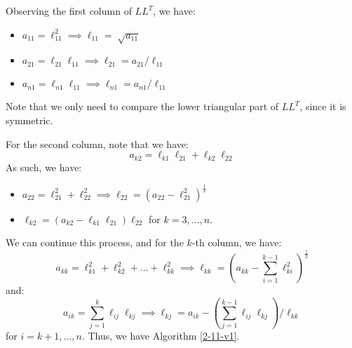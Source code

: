 \documentclass[../main/main.tex]{subfiles}
\begin{document}
    Observing the first column of $L L ^{ T }$, we have:
    \begin{itemize}
\item $a_{11} = \ell_{11}^2 \implies \ell_{11} = \sqrt[]{a_{11}}$
            \item $a_{21}= \ell_{21}\ell_{11} \implies \ell_{21} = a_{21} / \ell_{11}$
            \item $a_{n1}= \ell_{n1}\ell_{11} \implies \ell_{n1} = a_{n1} / \ell_{11}$
    \end{itemize}
    \begin{remark}
Note that we only need to compare the lower triangular part of $L L^{T}$, since it is symmetric.
    \end{remark}
    For the second column, note that we have: \[
a_{k2} = \ell_{k1}\ell_{21} + \ell_{k 2} \ell_{22}
    \] As such, we have:
    \begin{itemize}
\item $a_{22} = \ell_{21}^2 + \ell_{22}^2 \implies \ell_{22} = (a_{22}-\ell_{21}^2)^{\frac{1}{2}}$
            \item $\ell_{k 2} = (a_{k 2} - \ell_{k 1} \ell_{21}) \ell_{22}$ for $k = 3, \ldots , n$.
    \end{itemize}
    We can continue this process, and for the $k$-th column, we have: \[
      a_{k k} = \ell_{k 1}^2 + \ell_{k 2}^2 + \ldots + \ell_{k k}^2 \implies \ell_{k k} = (a_{k k} - \sum_{i=1}^{k-1} \ell_{k i }^2)^{\frac{1}{2}}
    \]and: \[
      a_{i k} = \sum_{j=1}^k \ell_{ij} \ell_{kj} \implies \ell_{k j} = a_{i k} - (\sum_{j=1}^{k-1} \ell_{ij} \ell_{kj}) / \ell_{k k}
    \] for $i = k+1, \ldots,n$. Thus, we have Algorithm \ref{2-11-v1}.
\end{document}
